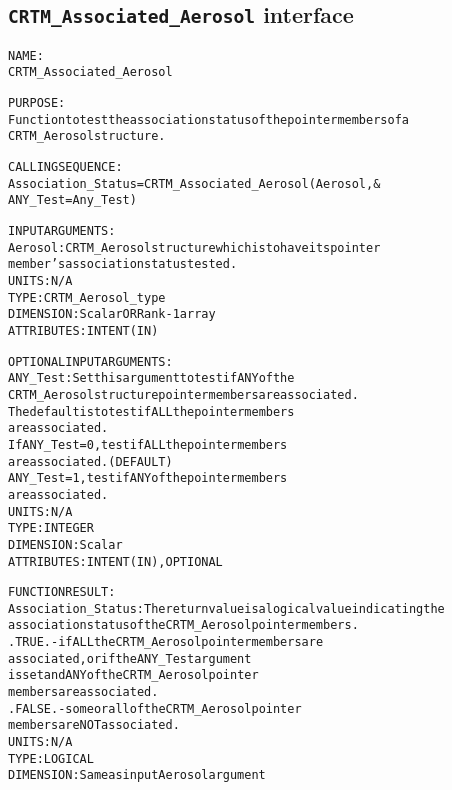 \subsection{\texttt{CRTM\_Associated\_Aerosol} interface}
  \label{sec:CRTM_Associated_Aerosol_interface}
  \begin{alltt}
 
  NAME:
        CRTM_Associated_Aerosol
 
  PURPOSE:
        Function to test the association status of the pointer members of a
        CRTM_Aerosol structure.
 
  CALLING SEQUENCE:
        Association_Status = CRTM_Associated_Aerosol( Aerosol          , &
                                                      ANY_Test=Any_Test  )
 
  INPUT ARGUMENTS:
        Aerosol:             CRTM_Aerosol structure which is to have its pointer
                             member's association status tested.
                             UNITS:      N/A
                             TYPE:       CRTM_Aerosol_type
                             DIMENSION:  Scalar OR Rank-1 array
                             ATTRIBUTES: INTENT(IN)
 
  OPTIONAL INPUT ARGUMENTS:
        ANY_Test:            Set this argument to test if ANY of the
                             CRTM_Aerosol structure pointer members are associated.
                             The default is to test if ALL the pointer members
                             are associated.
                             If ANY_Test = 0, test if ALL the pointer members
                                              are associated.  (DEFAULT)
                                ANY_Test = 1, test if ANY of the pointer members
                                              are associated.
                             UNITS:      N/A
                             TYPE:       INTEGER
                             DIMENSION:  Scalar
                             ATTRIBUTES: INTENT(IN), OPTIONAL
 
  FUNCTION RESULT:
        Association_Status:  The return value is a logical value indicating the
                             association status of the CRTM_Aerosol pointer members.
                             .TRUE.  - if ALL the CRTM_Aerosol pointer members are
                                       associated, or if the ANY_Test argument
                                       is set and ANY of the CRTM_Aerosol pointer
                                       members are associated.
                             .FALSE. - some or all of the CRTM_Aerosol pointer
                                       members are NOT associated.
                             UNITS:      N/A
                             TYPE:       LOGICAL
                             DIMENSION:  Same as input Aerosol argument
 
  \end{alltt}
